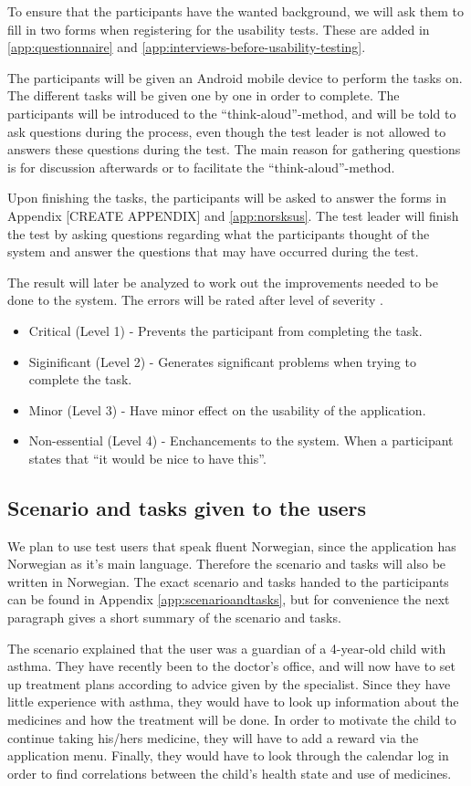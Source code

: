 To ensure that the participants have the wanted background, we will ask them to fill in two forms when registering for the usability tests. These are added in \ref{app:questionnaire} and \ref{app:interviews-before-usability-testing}.


The participants will be given an Android mobile device to perform the tasks on. The different tasks will be given one by one in order to complete. The participants will be introduced to the ``think-aloud''-method, and will be told to ask questions during the process, even though the test leader is not allowed to answers these questions during the test. The main reason for gathering questions is for discussion afterwards or to facilitate the ``think-aloud''-method. 

Upon finishing the tasks, the participants will be asked to answer the forms in Appendix [CREATE APPENDIX] and \ref{app:norsksus}. The test leader will finish the test by asking questions regarding what the participants thought of the system and answer the questions that may have occurred during the test. 

The result will later be analyzed to work out the improvements needed to be done to the system. The errors will be rated after level of severity \cite{dumas1995practical}. 

\begin{itemize}
\item{Critical (Level 1) - Prevents the participant from completing the task.}
\item{Siginificant (Level 2) - Generates significant problems when trying to complete the task.}
\item{Minor (Level 3) - Have minor effect on the usability of the application.}
\item{Non-essential (Level 4) - Enchancements to the system. When a participant states that ``it would be nice to have this''.}
\end{itemize}



\subsection{Scenario and tasks given to the users}
We plan to use test users that speak fluent Norwegian, since the application has Norwegian as it's main language. Therefore the scenario and tasks will also be written in Norwegian. The exact scenario and tasks handed to the participants can be found in Appendix \ref{app:scenarioandtasks}, but for convenience the next paragraph gives a short summary of the scenario and tasks.

The scenario explained that the user was a guardian of a 4-year-old child with asthma. They have recently been to the doctor's office, and will now have to set up treatment plans according to advice given by the specialist. Since they have little experience with asthma, they would have to look up information about the medicines and how the treatment will be done. In order to motivate the child to continue taking his/hers medicine, they will have to add a reward via the application menu. Finally, they would have to look through the calendar log in order to find correlations between the child's health state and use of medicines. 